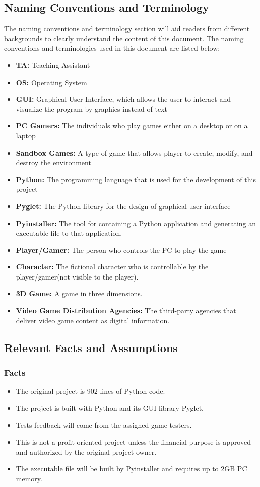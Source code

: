 \documentclass[12pt, titlepage]{article}
\begin{document}
\subsection{Naming Conventions and Terminology}
The naming conventions and terminology section will aid readers from different backgrounds to clearly understand the content of this document. The naming conventions and terminologies used in this document are listed below:
\begin{itemize}
        \item \textbf{TA:} Teaching Assistant
        \item \textbf{OS:} Operating System
        \item \textbf{GUI:} Graphical User Interface, which allows the user to interact and visualize the program by graphics instead of text
        \item \textbf{PC Gamers:} The individuals who play games either on a desktop or on a laptop
        \item \textbf{Sandbox Games:} A type of game that allows player to create, modify, and destroy the environment
        \item \textbf{Python:} The programming language that is used for the development of this project
        \item \textbf{Pyglet:} The Python library for the design of graphical user interface
        \item \textbf{Pyinstaller:} The tool for containing a Python application and generating an executable file to that application.
        \item \textbf{Player/Gamer:} The person who controls the PC to play the game
        \item \textbf{Character:} The fictional character who is controllable by the player/gamer(not visible to the player).
        \item \textbf{3D Game:} A game in three dimensions.
        \item \textbf{Video Game Distribution Agencies:} The third-party agencies that  deliver video game content as digital information.
\end{itemize}
\subsection{Relevant Facts and Assumptions}
\subsubsection{Facts}
\begin{itemize}
        \item The original project is 902 lines of Python code.
        \item The project is built with Python and its GUI library Pyglet.
        \item Tests feedback will come from the assigned game testers.
        \item This is not a profit-oriented project unless the financial purpose is approved and authorized by the original project owner.
        \item The executable file will be built by Pyinstaller and requires up to 2GB PC memory.
\end{itemize}
\end{document}

